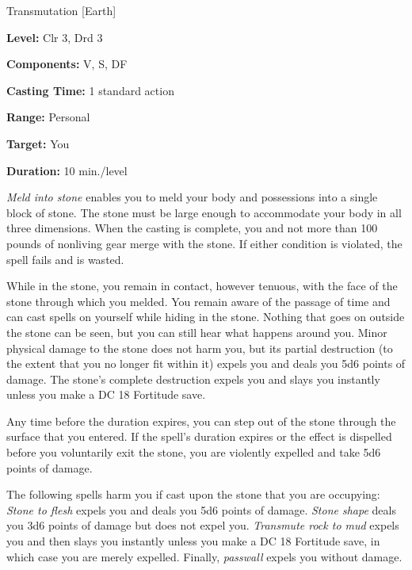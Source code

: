 
Transmutation [Earth]

\textbf{Level:} Clr 3, Drd 3

\textbf{Components:} V, S, DF

\textbf{Casting Time:} 1 standard action

\textbf{Range:} Personal

\textbf{Target:} You

\textbf{Duration:} 10 min./level

\textit{Meld into stone} enables you to meld your body and possessions into a single 
block of stone. The stone must be large enough to accommodate your body in all 
three dimensions. When the casting is complete, you and not more than 100 pounds 
of nonliving gear merge with the stone. If either condition is violated, the spell 
fails and is wasted.

While in the stone, you remain in contact, however tenuous, with the face of the 
stone through which you melded. You remain aware of the passage of time and can 
cast spells on yourself while hiding in the stone. Nothing that goes on outside 
the stone can be seen, but you can still hear what happens around you. Minor physical 
damage to the stone does not harm you, but its partial destruction (to the extent 
that you no longer fit within it) expels you and deals you 5d6 points of damage. 
The stone's complete destruction expels you and slays you instantly unless you 
make a DC 18 Fortitude save.

Any time before the duration expires, you can step out of the stone through the 
surface that you entered. If the spell's duration expires or the effect is dispelled 
before you voluntarily exit the stone, you are violently expelled and take 5d6 
points of damage.

The following spells harm you if cast upon the stone that you are occupying: \textit{Stone 
to flesh} expels you and deals you 5d6 points of damage. \textit{Stone shape} deals 
you 3d6 points of damage but does not expel you. \textit{Transmute rock to mud 
}expels you and then slays you instantly unless you make a DC 18 Fortitude save, 
in which case you are merely expelled. Finally, \textit{passwall} expels you without 
damage.

